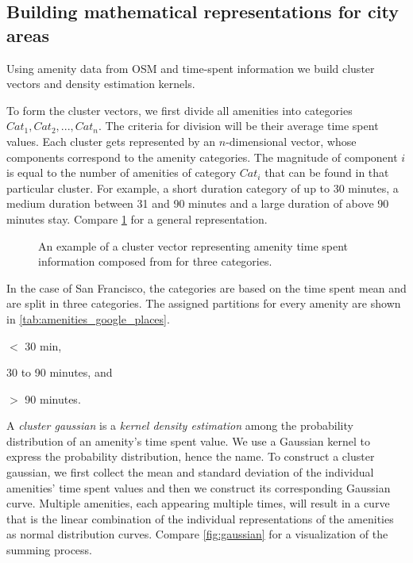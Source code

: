 	\subsection{Building mathematical representations for city areas}
	Using amenity data from OSM and time-spent information we build cluster vectors and density estimation kernels.
	
	To form the cluster vectors, we first divide all amenities into categories $Cat_1, Cat_2, ..., Cat_n$. The criteria for division will be their average time spent values. Each cluster gets represented by an $n$-dimensional vector, whose components correspond to the amenity categories. The magnitude of component $i$ is equal to the number of amenities of category $Cat_i$ that can be found in that particular cluster. For example, a short duration category of up to 30 minutes, a medium duration between 31 and 90 minutes and a large duration of above 90 minutes stay. Compare \cref{fig:cluster_vector} for a general representation.
	
	\begin{figure}[!ht]
		\centering
		
		\caption{An example of a cluster vector representing amenity time spent information composed from for three categories.}
		\label{fig:cluster_vector}
	\end{figure}
	
	In the case of San Francisco, the categories are based on the time spent mean and are split in three categories. The assigned partitions for every amenity are shown in \cref{tab:amenities_google_places}.
	\begin{romanlist}
		\item $<$ 30 min,
		\item 30 to 90 minutes, and
		\item $>$ 90 minutes. 
	\end{romanlist}
	
	A \textit{cluster gaussian} is a \textit{kernel density estimation} among the probability distribution of an amenity's time spent value. We use a Gaussian kernel to express the probability distribution, hence the name. To construct a cluster gaussian, we first collect the mean and standard deviation of the individual amenities' time spent values and then we construct its corresponding Gaussian curve. Multiple amenities, each appearing multiple times, will result in a curve that is the linear combination of the individual representations of the amenities as normal distribution curves. Compare \cref{fig:gaussian} for a visualization of the summing process.
	
